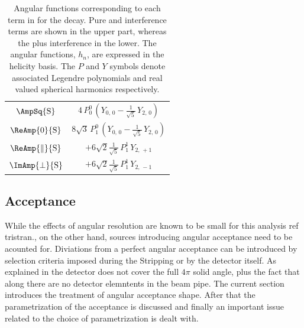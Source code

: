 \begin{table}[t]
\begin{tabular}{cc}
    \hline
    $\AmpSq{{\text{S}}}$  &
      $4\, P_0^0\, (Y_{0,\,0} - \tfrac{1}{\sqrt{5}}\, Y_{2,\,0})$  \\ %

    $\ReAmp{0}{{\text{S}}}$  &
      $8\sqrt{3}\, P_1^0\, (Y_{0,\,0} - \tfrac{1}{\sqrt{5}}\, Y_{2,\,0})$ \\ %

    $\ReAmp{\parallel}{{\text{S}}}$  &
      $+6\sqrt{2}\tfrac{1}{\sqrt{5}}\, P_1^1\, Y_{2,\,+1}$  \\ %

    $\ImAmp{\perp}{{\text{S}}}$  &
      $+6\sqrt{2}\tfrac{1}{\sqrt{5}}\, P_1^1\, Y_{2,\,-1}$  \\ %
    \hline
  \end{tabular}
  \caption{ Angular functions corresponding to each term in  for the \BJpsiKst decay. Pure and interference \pwave terms are shown in the upper part,
    whereas the \swave plus \spwave interference in the lower. The angular functions, $h_n$, are expressed in the helicity basis. The $P$ and $Y$ symbols denote
    associated Legendre polynomials and real valued spherical harmonics respectively.}
  \label{ang_distr}
\end{table}

\subsection{Acceptance}
\label{Accceptance}
While the effects of angular resolution are known to be small for this analysis{\color{red} ref tristran.},
on the other hand, sources introducing angular acceptance need to be acounted for.
Diviations from a perfect angular acceptance can be introduced by selection criteria imposed during the Stripping or by the detector itself.
As explained in  the \lhcb detector does not cover the full $4\pi$ solid angle, plus the fact that
along there are no detector elemntents in the \lhc beam pipe. The current section introduces the treatment of
angular acceptance shape. After that the parametrization of the acceptance is discussed and finally an important
issue related to the choice of parametrization is dealt with.

